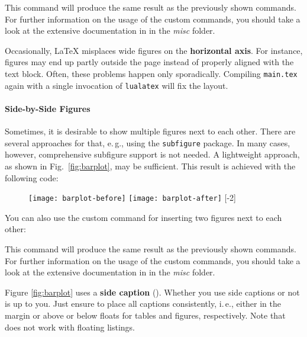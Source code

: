 This command will produce the same result as the previously shown commands.
For further information on the usage of the custom commands, you should take a look at the extensive documentation in  in the \emph{misc} folder.

Occasionally, LaTeX misplaces wide figures on the \textbf{horizontal axis}. For instance, figures may end up partly outside the page instead of properly aligned with the text block. Often, these problems happen only sporadically. Compiling \texttt{main.tex} again with a single invocation of \texttt{lualatex} will fix the layout.

\paragraph{Side-by-Side Figures} Sometimes, it is desirable to show multiple figures next to each other. There are several approaches for that, e.\,g., using the \texttt{subfigure} package. In many cases, however, comprehensive subfigure support is not needed. A lightweight approach, as shown in Fig.~\ref{fig:barplot}, may be sufficient. This result is achieved with the following code:
\begin{latex}
\begin{figure}[t]
\centering
\texttt{[image: barplot-before]}%
\hspace{\fill}%
\texttt{[image: barplot-after]}
[-2\baselineskip]
\end{figure}
\end{latex}

You can also use the custom command  for inserting two figures next to each other:

\begin{latex}
\end{latex}

This command will produce the same result as the previously shown commands.
For further information on the usage of the custom commands, you should take a look at the extensive documentation in  in the \emph{misc} folder.


Figure \ref{fig:barplot} uses a \textbf{side caption} (). Whether you use side captions or not is up to you.
Just ensure to place all captions consistently, i.\,e., either in the margin or above or below floats for tables and figures, respectively. Note that  does not work with floating listings.

